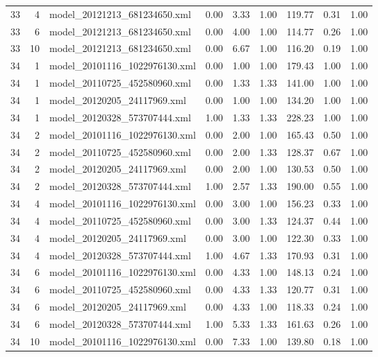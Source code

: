 \begin{table}[ht]
\begin{tabular}{rrlrrrrrr}
   33 &   4 & model\_20121213\_681234650.xml & 0.00 & 3.33 & 1.00 & 119.77 & 0.31 & 1.00 \\ 
   33 &   6 & model\_20121213\_681234650.xml & 0.00 & 4.00 & 1.00 & 114.77 & 0.26 & 1.00 \\ 
   33 &  10 & model\_20121213\_681234650.xml & 0.00 & 6.67 & 1.00 & 116.20 & 0.19 & 1.00 \\ 
   34 &   1 & model\_20101116\_1022976130.xml & 0.00 & 1.00 & 1.00 & 179.43 & 1.00 & 1.00 \\ 
   34 &   1 & model\_20110725\_452580960.xml & 0.00 & 1.33 & 1.33 & 141.00 & 1.00 & 1.00 \\ 
   34 &   1 & model\_20120205\_24117969.xml & 0.00 & 1.00 & 1.00 & 134.20 & 1.00 & 1.00 \\ 
   34 &   1 & model\_20120328\_573707444.xml & 1.00 & 1.33 & 1.33 & 228.23 & 1.00 & 1.00 \\ 
   34 &   2 & model\_20101116\_1022976130.xml & 0.00 & 2.00 & 1.00 & 165.43 & 0.50 & 1.00 \\ 
   34 &   2 & model\_20110725\_452580960.xml & 0.00 & 2.00 & 1.33 & 128.37 & 0.67 & 1.00 \\ 
   34 &   2 & model\_20120205\_24117969.xml & 0.00 & 2.00 & 1.00 & 130.53 & 0.50 & 1.00 \\ 
   34 &   2 & model\_20120328\_573707444.xml & 1.00 & 2.57 & 1.33 & 190.00 & 0.55 & 1.00 \\ 
   34 &   4 & model\_20101116\_1022976130.xml & 0.00 & 3.00 & 1.00 & 156.23 & 0.33 & 1.00 \\ 
   34 &   4 & model\_20110725\_452580960.xml & 0.00 & 3.00 & 1.33 & 124.37 & 0.44 & 1.00 \\ 
   34 &   4 & model\_20120205\_24117969.xml & 0.00 & 3.00 & 1.00 & 122.30 & 0.33 & 1.00 \\ 
   34 &   4 & model\_20120328\_573707444.xml & 1.00 & 4.67 & 1.33 & 170.93 & 0.31 & 1.00 \\ 
   34 &   6 & model\_20101116\_1022976130.xml & 0.00 & 4.33 & 1.00 & 148.13 & 0.24 & 1.00 \\ 
   34 &   6 & model\_20110725\_452580960.xml & 0.00 & 4.33 & 1.33 & 120.77 & 0.31 & 1.00 \\ 
   34 &   6 & model\_20120205\_24117969.xml & 0.00 & 4.33 & 1.00 & 118.33 & 0.24 & 1.00 \\ 
   34 &   6 & model\_20120328\_573707444.xml & 1.00 & 5.33 & 1.33 & 161.63 & 0.26 & 1.00 \\ 
   34 &  10 & model\_20101116\_1022976130.xml & 0.00 & 7.33 & 1.00 & 139.80 & 0.18 & 1.00 \\ 

\end{tabular}
\end{table}
